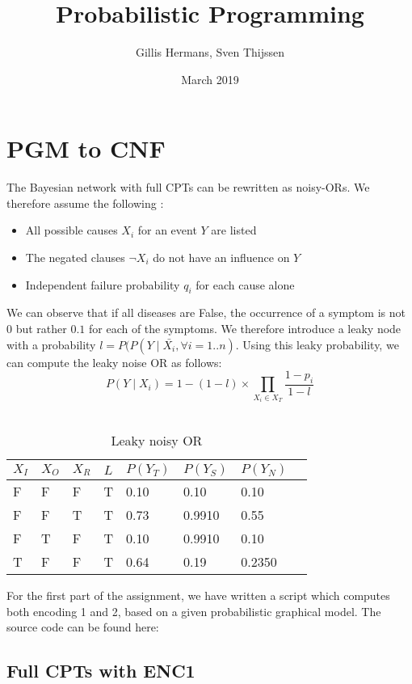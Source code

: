 \documentclass{article}
\title{Probabilistic Programming}
\author{Gillis Hermans, Sven Thijssen}
\date{March 2019}
\begin{document}
\maketitle

\section{PGM to CNF}

The Bayesian network with full CPTs can be rewritten as noisy-ORs. We therefore assume the following \cite{noisyor}:
\begin{itemize}
    \item All possible causes $X_i$ for an event $Y$ are listed
    \item The negated clauses $\neg X_i$ do not have an influence on $Y$
    \item Independent failure probability $q_i$ for each cause alone
\end{itemize}

We can observe that if all diseases are False, the occurrence of a symptom is not $0$ but rather $0.1$ for each of the symptoms. We therefore introduce a leaky node with a probability $l = P(P(Y \mid \bar{X_i}, \forall i = 1..n)$.
Using this leaky probability, we can compute the leaky noise OR as follows:
$$P(Y \mid X_i) = 1-(1-l) \times \prod_{X_i \in X_T}\frac{1-p_i}{1-l}$$\\

\begin{table}[h]
\centering
\begin{tabular}{l l l l | l | l | l | l}
	\hline
	$X_I$	&	$X_O$	&	$X_R$	&	$L$		&	$P(Y_T)$		&	$P(Y_S)$		&	$P(Y_N)$\\
	\hline
	F		&	F		&	F		&	T		&	0.10			&	0.10			&	0.10\\
	F		&	F		&	T		&	T		&	0.73			&	0.9910		&	0.55\\
	F		&	T		&	F		&	T		&	0.10			&	0.9910		&	0.10\\
	T		&	F		&	F		&	T		&	0.64			&	0.19			&	0.2350\\
	\hline
\end{tabular}
\caption{Leaky noisy OR}
\end{table}

For the first part of the assignment, we have written a script which computes both encoding 1 and 2, based on a given probabilistic graphical model. The source code can be found here:
\subsection{Full CPTs with ENC1}
\end{document}
